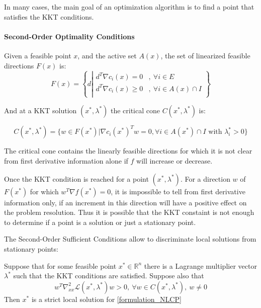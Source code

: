 In many cases, the main goal of an optimization algorithm is to find a point that satisfies the KKT conditions.

\paragraph{Second-Order Optimality Conditions}

\begin{definition}
  Given a feasible point $x$, and the active set $\mathit{A}(x)$, the  set of linearized feasible directions $F(x)$ is:
  \begin{equation}
    F(x)=\left\{d\left|
        \begin{array}{ll}
          d^T\nabla c_i(x) = 0&,\ \forall i\in E \\
          d^T\nabla c_i(x) \geq 0&,\ \forall i\in \mathit{A}(x)\cap I \\
        \end{array}
        \right.
    \right\}
  \end{equation}
\end{definition}

And at a KKT solution $(x^*,\lambda^*)$ the critical cone $C(x^*, \lambda^*)$ is:

\begin{equation}
  C(x^*,\lambda^*) = \{w\in F(x^*)|\nabla c_i(x^*)^Tw=0, \forall i\in\mathit{A}(x^*)\cap I \text{ with } \lambda_i^*>0\}
\end{equation}

The critical cone contains the linearly feasible directions for which it is not clear from first derivative information alone if $f$ will increase or decrease.

Once the KKT condition is reached for a point $(x^*, \lambda^*)$.
For a direction $w$ of $F(x^*)$ for which $w^T\nabla f(x^*)=0$, it is impossible to tell from first derivative information only, if an increment in this direction will have a positive effect on the problem resolution.
Thus it is possible that the KKT constaint is not enough to determine if a point is a solution or just a stationary point.

The Second-Order Sufficient Conditions allow to discriminate local solutions from stationary points:

\begin{theorem}
  Suppose that for some feasible point $x^*\in \mathbb{R}^n$ there is a Lagrange multiplier vector $\lambda^*$ such that the KKT conditions are satisfied. Suppose also that
  \begin{equation}
    w^T\nabla_{xx}^2\mathcal{L}(x^*,\lambda^*)w>0,\ \forall w\in C(x^*,\lambda^*),\ w\neq 0
  \end{equation}
  Then $x^*$ is a strict local solution for \ref{formulation_NLCP}
\end{theorem}

